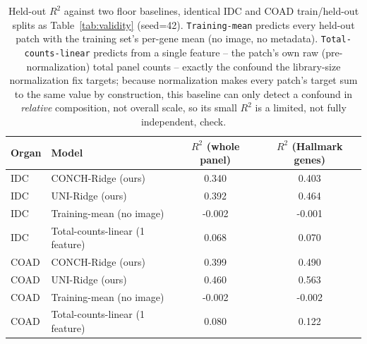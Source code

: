 \begin{table}[t]
\centering
\caption{Held-out $R^2$ against two floor baselines, identical IDC and COAD train/held-out splits as Table~\ref{tab:validity} (seed=42). \texttt{Training-mean} predicts every held-out patch with the training set's per-gene mean (no image, no metadata). \texttt{Total-counts-linear} predicts from a single feature -- the patch's own raw (pre-normalization) total panel counts -- exactly the confound the library-size normalization fix targets; because normalization makes every patch's target sum to the same value by construction, this baseline can only detect a confound in \emph{relative} composition, not overall scale, so its small $R^2$ is a limited, not fully independent, check.}
\label{tab:baseline_comparison}
\begin{tabular}{llcc}
\toprule
Organ & Model & $R^2$ (whole panel) & $R^2$ (Hallmark genes) \\
\midrule
IDC & CONCH-Ridge (ours) & 0.340 & 0.403 \\
IDC & UNI-Ridge (ours) & 0.392 & 0.464 \\
IDC & Training-mean (no image) & -0.002 & -0.001 \\
IDC & Total-counts-linear (1 feature) & 0.068 & 0.070 \\
COAD & CONCH-Ridge (ours) & 0.399 & 0.490 \\
COAD & UNI-Ridge (ours) & 0.460 & 0.563 \\
COAD & Training-mean (no image) & -0.002 & -0.002 \\
COAD & Total-counts-linear (1 feature) & 0.080 & 0.122 \\
\bottomrule
\end{tabular}
\end{table}
